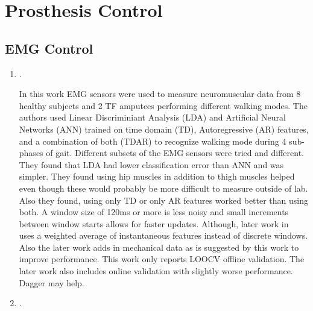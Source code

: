 \chapter{Prosthesis Control} \label{ch:pros_control}

\section{EMG Control} \label{sec:emg_pros_control}

\begin{enumerate} 
    \item {}. 

    
    In this work EMG sensors were used to measure neuromuscular data from 8
    healthy subjects and 2 TF amputees performing different walking modes. The
    authors used Linear Discriminiant Analysis (LDA) and Artificial Neural
    Networks (ANN) trained on time domain (TD), Autoregressive (AR) features,
    and a combination of both (TDAR) to recognize walking mode during 4
    sub-phases of gait. Different subsets of the EMG sensors were tried and
    different. They found that LDA had lower classification error than ANN and
    was simpler. They found using hip muscles in addition to thigh muscles
    helped even though these would probably be more difficult to measure outside
    of lab. Also they found, using only TD or only AR features worked better
    than using both. A window size of 120ms or more is less noisy and small
    increments between window starts allows for faster updates.  Although, later
    work in~\citet{hargrove2015intuitive} uses a weighted average of
    instantaneous features instead of discrete windows. Also the later work adds
    in mechanical data as is suggested by this work to improve performance. This
    work only reports LOOCV offline validation. The later work also includes
    online validation with slightly worse performance. Dagger may help.  

    \item {}. 


\end{enumerate}
